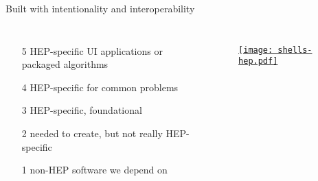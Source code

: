 \begin{frame}{Built with intentionality and interoperability}
  \begin{columns}
    \begin{enumerate}\setlength{\itemsep}{0.5 cm}
      \item[5] HEP-specific UI applications or packaged algorithms
      \item[4] HEP-specific for common problems
      \item[3] HEP-specific, foundational
      \item[2] needed to create, but not really HEP-specific
      \item[1] non-HEP software we depend on
    \end{enumerate}
%
    \begin{figure}
        \begin{center}
            \href{https://indico.cern.ch/event/1140031/}{\texttt{[image: shells-hep.pdf]}}
        \end{center}
    \end{figure}
  \end{columns}
\end{frame}
